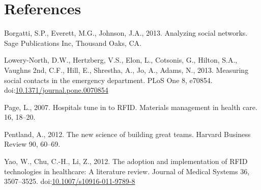 \documentclass[]{elsarticle} %
\newlength{\cslhangindent}
\newlength{\cslentryspacingunit} %
\newenvironment{CSLReferences}[2] %
 {%
  \setlength{\parindent}{0pt}
  \ifodd #1
  \let\oldpar\par
  \def\par{\hangindent=\cslhangindent\oldpar}
  \fi
  \setlength{\parskip}{#2\cslentryspacingunit}
 }%
 {}
\begin{document}
\hypertarget{references}{%
\section*{References}\label{references}}

\hypertarget{refs}{}
\begin{CSLReferences}{1}{0}
\leavevmode{}%
Borgatti, S.P., Everett, M.G., Johnson, J.A., 2013. Analyzing social
networks. Sage Publications Inc, Thousand Oaks, CA.

\leavevmode{}%
Lowery-North, D.W., Hertzberg, V.S., Elon, L., Cotsonis, G., Hilton,
S.A., Vaughns 2nd, C.F., Hill, E., Shrestha, A., Jo, A., Adams, N.,
2013. Measuring social contacts in the emergency department. PLoS One 8,
e70854.
doi:\href{https://doi.org/10.1371/journal.pone.0070854}{10.1371/journal.pone.0070854}

\leavevmode{}%
Page, L., 2007. Hospitals tune in to RFID. Materials management in
health care. 16, 18--20.

\leavevmode{}%
Pentland, A., 2012. The new science of building great teams. Harvard
Business Review 90, 60--69.

\leavevmode{}%
Yao, W., Chu, C.-H., Li, Z., 2012. The adoption and implementation of
RFID technologies in healthcare: A literature review. Journal of Medical
Systems 36, 3507--3525.
doi:\href{https://doi.org/10.1007/s10916-011-9789-8}{10.1007/s10916-011-9789-8}

\end{CSLReferences}
\end{document}
